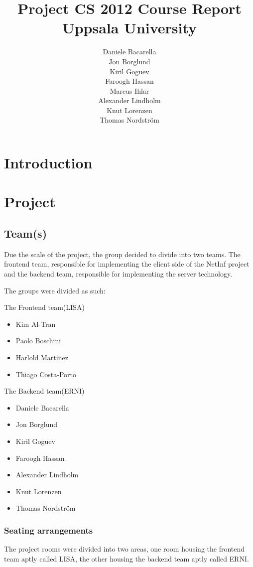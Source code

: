 \documentclass[11pt]{report}
\title{Project CS 2012 Course Report\\Uppsala University\\}
\author{Daniele Bacarella\\
Jon Borglund\\
Kiril Goguev\\
		Faroogh Hassan\\
		Marcus Ihlar\\
		Alexander Lindholm\\
		Knut Lorenzen\\
		Thomas Nordstr\"om\\
}
\date{}
\begin{document}
\maketitle

\tableofcontents

\chapter{Introduction}

\chapter{Project}

\section{Team(s)}
Due the scale of the project, the group decided to divide into two teams. The frontend team, responsible for implementing the client side of the NetInf project and the backend team, responsible for implementing the server technology.


The groups were divided as such:

The Frontend team(LISA)
\begin{itemize}
\item Kim Al-Tran
\item Paolo Boschini
\item Harlold Martinez
\item Thiago Costa-Porto
\end{itemize}

The Backend team(ERNI) 

\begin {itemize}
\item Daniele Bacarella
\item Jon Borglund
\item Kiril Goguev
\item Faroogh Hassan
\item Alexander Lindholm
\item Knut Lorenzen
\item Thomas Nordstr\"om
\end {itemize}

\subsection{Seating arrangements}

The project rooms were divided into two areas, one room housing the frontend team aptly called LISA, the other housing the backend team aptly called ERNI. 
\end{document}
